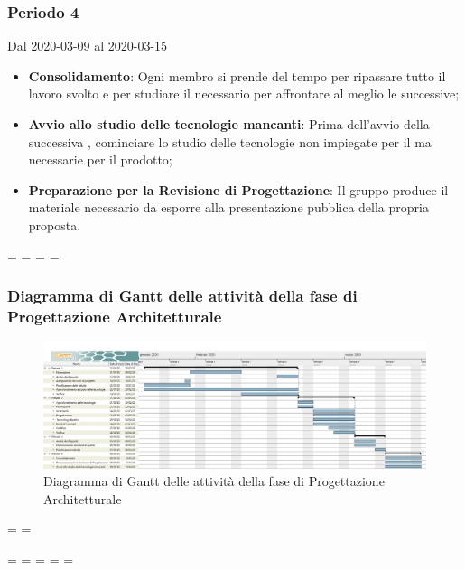 \subsubsection{Periodo 4} 
Dal 2020-03-09 al 2020-03-15
\begin{itemize}
	\item \textbf{Consolidamento}: Ogni membro si prende del tempo per ripassare tutto il lavoro svolto e per studiare il necessario per affrontare al meglio le  successive;
	\item \textbf{Avvio allo studio delle tecnologie mancanti}: Prima dell'avvio della successiva , cominciare lo studio delle tecnologie non impiegate per il  ma necessarie per il prodotto;
	\item \textbf{Preparazione per la Revisione di Progettazione}: Il gruppo produce il materiale necessario da esporre alla presentazione pubblica della propria proposta.
\end{itemize}

\newpage
\paperwidth=\pdfpageheight
\paperheight=\pdfpagewidth
\pdfpageheight=\paperheight
\pdfpagewidth=\paperwidth

\begingroup 
\subsubsection{Diagramma di Gantt delle attività della fase di Progettazione Architetturale}
\pagestyle{empty}
\begin{figure}[h]
	\centering
	\includegraphics[scale=0.26]{Sezioni/DiagrammiGantt/ProgettazioneArchitetturale.png}
	\caption{Diagramma di Gantt delle attività della fase di Progettazione Architetturale}	
\end{figure}

\textwidth=\hsize
\textheight=\vsize

\endgroup
\newpage
\paperwidth=\pdfpageheight
\paperheight=\pdfpagewidth
\pdfpageheight=\paperheight
\pdfpagewidth=\paperwidth
\headwidth=\textwidth

\clearpage